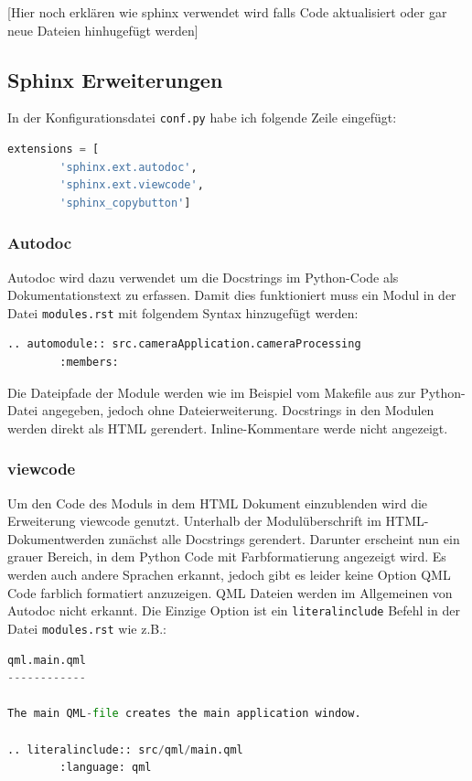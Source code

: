 [Hier noch erklären wie sphinx verwendet wird falls Code aktualisiert oder gar neue Dateien hinhugefügt werden]
\subsection{Sphinx Erweiterungen}\label{subsec:sphinx-erweiterungen}

In der Konfigurationsdatei \verb|conf.py| habe ich folgende Zeile eingefügt:

\begin{lstlisting}[language = python,label={lst:sphinxExt}]
extensions = [
        'sphinx.ext.autodoc',
        'sphinx.ext.viewcode',
        'sphinx_copybutton']
\end{lstlisting}

\subsubsection{Autodoc}
Autodoc wird dazu verwendet um die Docstrings im Python-Code als Dokumentationstext zu erfassen.
Damit dies funktioniert muss ein Modul in der Datei \verb|modules.rst| mit folgendem Syntax hinzugefügt werden:
\begin{lstlisting}[language = python,label={lst:sphinxAutomodule}]
.. automodule:: src.cameraApplication.cameraProcessing
        :members:
\end{lstlisting}

Die Dateipfade der Module werden wie im Beispiel vom Makefile aus zur Python-Datei angegeben, jedoch ohne Dateierweiterung.
Docstrings in den Modulen werden direkt als HTML gerendert.
Inline-Kommentare werde nicht angezeigt.

\subsubsection{viewcode}

Um den Code des Moduls in dem HTML Dokument einzublenden wird die Erweiterung viewcode genutzt.
Unterhalb der Modulüberschrift im HTML-Dokumentwerden zunächst alle Docstrings gerendert.
Darunter erscheint nun ein grauer Bereich, in dem Python Code mit Farbformatierung angezeigt wird.
Es werden auch andere Sprachen erkannt, jedoch gibt es leider keine Option QML Code farblich formatiert
anzuzeigen.
QML Dateien werden im Allgemeinen von Autodoc nicht erkannt.
Die Einzige Option ist ein \verb|literalinclude| Befehl in der Datei \verb|modules.rst| wie z.B.:
\begin{lstlisting}[language = python,label={lst:sphinxQML}]
qml.main.qml
------------

The main QML-file creates the main application window.

.. literalinclude:: src/qml/main.qml
        :language: qml
\end{lstlisting}

